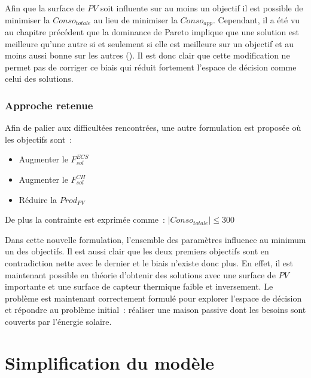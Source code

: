 Afin que la surface de $PV$ soit influente sur au moins un objectif il est possible
de minimiser la $Conso_{totale}$ au lieu de minimiser la $Conso_{app}$.
Cependant, il a été vu au chapitre précédent que la dominance de Pareto implique que une solution
est meilleure qu’une autre si et seulement si elle est meilleure sur un objectif et au moins
aussi bonne sur les autres (). Il est donc clair que
cette modification ne permet pas de corriger ce biais qui réduit fortement l’espace
de décision comme celui des solutions.


\subsubsection{Approche retenue} %
\label{ssub:approche_retenue}
Afin de palier aux difficultées rencontrées, une autre formulation est proposée où les objectifs
sont~:
\begin{itemize}
  \item Augmenter le $F_{sol}^{ECS}$
  \item Augmenter le $F_{sol}^{CH}$
  \item Réduire la $Prod_{PV}$
\end{itemize}
De plus la contrainte est exprimée comme~: $|Conso_{totale}| \leq 300$

Dans cette nouvelle formulation, l’ensemble des paramètres influence au minimum un des
objectifs. Il est aussi clair que les deux premiers objectifs sont en contradiction nette
avec le dernier et le biais n’existe donc plus. En effet, il est maintenant possible en
théorie d’obtenir des solutions avec une surface de $PV$ importante et une surface de
capteur thermique faible et inversement.
Le problème est maintenant correctement formulé pour explorer l’espace de décision et
répondre au problème initial~: réaliser une maison passive dont les besoins sont couverts
par l’énergie solaire.





\section{Simplification du modèle} %
\label{sec:simplification_du_modele}
